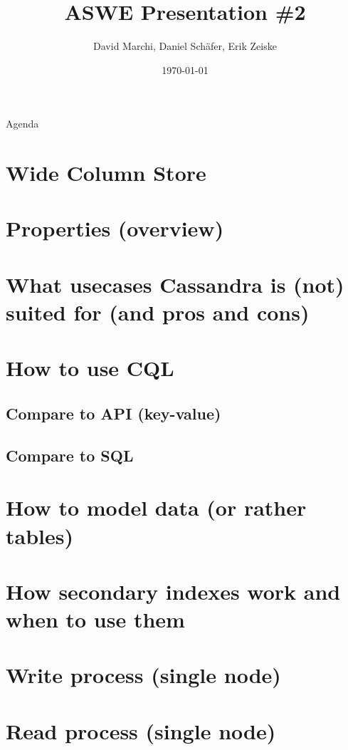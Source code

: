 \documentclass[10pt]{beamer}
\title{ASWE Presentation \#2}
\subtitle{}
\date{\today}
\author{David Marchi, Daniel Schäfer, Erik Zeiske}
\begin{document}
\maketitle

\begin{frame}{Agenda}
  \tableofcontents
\end{frame}

\section{Wide Column Store}  %

\section{Properties (overview)}  %

\section{What usecases Cassandra is (not) suited for (and pros and cons)}  %

\section{How to use CQL}  %
\subsection{Compare to API (key-value)}
\subsection{Compare to SQL}

\section{How to model data (or rather tables)}  %

\section{How secondary indexes work and when to use them}  %

\section{Write process (single node)}  %

\section{Read process (single node)}  %
\end{document}
